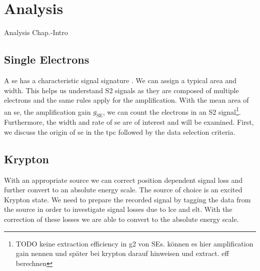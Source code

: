 \FloatBarrier
\chapter{Analysis}
\label{chap:Analysis}
\FloatBarrier

Analysis Chap.-Intro

\FloatBarrier
\section{Single Electrons}
\label{sec:SE}
\FloatBarrier

A \gls{se} has a characteristic signal signature .
We can assign a typical area and width.
This helps us understand S2 signals as they are composed of multiple electrons and the same rules apply for the amplification.
With the mean area of an \gls{se}, the amplification gain $ g_\mathrm{SE} $, we can count the electrons in an S2 signal\footnote{TODO keine extraction efficiency in g2 von SEs. können es hier amplification gain nennen und später bei krypton darauf hinweisen und extract. eff berechnen}.
Furthermore, the width and rate of \gls{se} are of interest and will be examined.
First, we discuss the origin of \gls{se} in the \gls{tpc} followed by the data selection criteria.



\newpage

\newpage

\newpage

\newpage

\newpage

\FloatBarrier
\section{Krypton}
\label{sec:Kr}
\FloatBarrier

With an appropriate source we can correct position dependent signal loss and further convert to an absolute energy scale.
The source of choice is an excited Krypton state.
We need to prepare the recorded signal by tagging the data from the source in order to investigate signal losses due to \gls{lce} and \gls{elt}.
With the correction of these losses we are able to convert to the absolute energy scale.



\newpage

\newpage

\newpage

\newpage

\newpage

\newpage

\newpage

\newpage
\FloatBarrier
